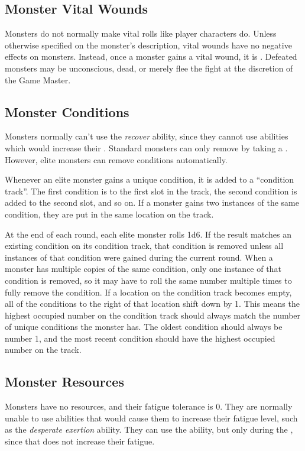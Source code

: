   \subsection{Monster Vital Wounds}
    Monsters do not normally make vital rolls like player characters do.
    Unless otherwise specified on the monster's description, vital wounds have no negative effects on monsters.
    Instead, once a monster gains a vital wound, it is .
    Defeated monsters may be unconscious, dead, or merely flee the fight at the discretion of the Game Master.

  \subsection{Monster Conditions}\label{Monster Conditions}
    Monsters normally can't use the \textit{recover} ability, since they cannot use abilities which would increase their .
    Standard monsters can only remove  by taking a .
    However, elite monsters can remove conditions automatically.

    Whenever an elite monster gains a unique condition, it is added to a ``condition track''.
    The first condition is to the first slot in the track, the second condition is added to the second slot, and so on.
    If a monster gains two instances of the same condition, they are put in the same location on the track.

    At the end of each round, each elite monster rolls 1d6.
    If the result matches an existing condition on its condition track, that condition is removed unless all instances of that condition were gained during the current round.
    When a monster has multiple copies of the same condition, only one instance of that condition is removed, so it may have to roll the same number multiple times to fully remove the condition.
    If a location on the condition track becomes empty, all of the conditions to the right of that location shift down by 1.
    This means the highest occupied number on the condition track should always match the number of unique conditions the monster has.
    The oldest condition should always be number 1, and the most recent condition should have the highest occupied number on the track.

  \subsection{Monster Resources}
    Monsters have no resources, and their fatigue tolerance is 0.
    They are normally unable to use abilities that would cause them to increase their fatigue level, such as the \textit{desperate exertion} ability.
    They can use the  ability, but only during the , since that does not increase their fatigue.

